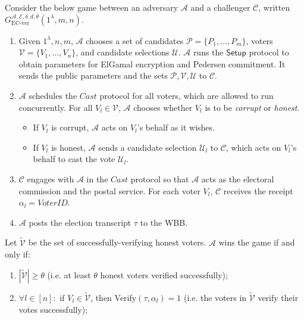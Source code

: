 \documentclass[12pt,a4paper]{article}
\theoremstyle{definition}
\newcommand{\VoterID}{\mathit{VoterID}}
\newcounter{protocol}
\begin{document}
\begin{definition}[EC Verifiability]
    Consider the below game between an adversary $\mathcal{A}$ and a challenger $\mathcal{C}$, written $G_\text{EC-ver}^{\mathcal{A},\mathcal{E},\delta,d,\theta}(1^\lambda, m, n)$.
    \begin{enumerate}
        \item Given $1^\lambda, n, m$, $\mathcal{A}$ chooses a set of candidates $\mathcal{P}=\{P_1,\ldots,P_m\}$, voters $\mathcal{V}=\{V_1,\ldots,V_n\}$, and candidate selections $\mathcal{U}$. $\mathcal{A}$ runs the $\mathsf{Setup}$ protocol to obtain parameters for ElGamal encryption and Pedersen commitment. It sends the public parameters and the sets $\mathcal{P}, \mathcal{V}, \mathcal{U}$ to $\mathcal{C}$.
        
        \item $\mathcal{A}$ schedules the $\mathit{Cast}$ protocol for all voters, which are allowed to run concurrently. For all $V_l\in\mathcal{V}$, $\mathcal{A}$ chooses whether $V_l$ is to be \textit{corrupt} or \textit{honest}.
        \begin{itemize}
            \item If $V_l$ is corrupt, $\mathcal{A}$ acts on $V_l$'s behalf as it wishes.
            \item If $V_l$ is honest, $\mathcal{A}$ sends a candidate selection $\mathcal{U}_l$ to $\mathcal{C}$, which acts on $V_l$'s behalf to cast the vote $\mathcal{U}_l$.
        \end{itemize}

        \item $\mathcal{C}$ engages with $\mathcal{A}$ in the $\mathit{Cast}$ protocol so that $\mathcal{A}$ acts as the electoral commission and the postal service. For each voter $V_l$, $\mathcal{C}$ receives the receipt $\alpha_l=\VoterID$.

        \item $\mathcal{A}$ posts the election transcript $\tau$ to the WBB.
    \end{enumerate}
    Let $\tilde{\mathcal{V}}$ be the set of successfully-verifying honest voters. $\mathcal{A}$ wins the game if and only if:
    \begin{enumerate}
        \item $|\tilde{\mathcal{V}}| \geq \theta$ (i.e. at least $\theta$ honest voters verified successfully);
        \item $\forall l \in [n]:$ if $V_l \in \tilde{\mathcal{V}}$, then Verify$(\tau, \alpha_l) 	=1$ (i.e. the voters in $\tilde{\mathcal{V}}$ verify their votes successfully);
    

\end{enumerate}
\end{definition}
\end{document}
